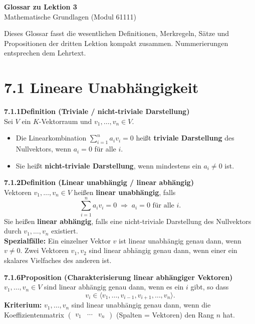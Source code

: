 \documentclass[a4paper,12pt]{article}
\newcommand{\gentry}[3]{%
  \noindent\textbf{#1\quad #2}\nopagebreak\\[0.2em]
  #3\par\smallskip
}
\begin{document}
\begin{center}
  {\LARGE\bfseries Glossar zu Lektion 3}\\[0.5em]
  {\large Mathematische Grundlagen (Modul 61111)}
\end{center}

\vspace{1em}

Dieses Glossar fasst die wesentlichen Definitionen, Merkregeln, Sätze und
Propositionen der dritten Lektion kompakt zusammen. Nummerierungen
entsprechen dem Lehrtext.

\section*{7.1 \quad Lineare Unabhängigkeit}

\gentry{7.1.1}{Definition (Triviale / nicht-triviale Darstellung)}{%
  Sei $V$ ein $K$-Vektorraum und $v_1,\ldots,v_n \in V$.
  \begin{itemize}[topsep=2pt,itemsep=1pt]
    \item Die Linearkombination $\sum_{i=1}^n a_i v_i = 0$ heißt
          \textbf{triviale Darstellung} des Nullvektors, wenn $a_i = 0$ für alle $i$.
    \item Sie heißt \textbf{nicht-triviale Darstellung}, wenn mindestens ein
          $a_i \neq 0$ ist.
  \end{itemize}
}

\gentry{7.1.2}{Definition (Linear unabhängig / linear abhängig)}{%
  Vektoren $v_1,\ldots,v_n \in V$ heißen \textbf{linear unabhängig}, falls
  \[
    \sum_{i=1}^n a_i v_i = 0 \;\Longrightarrow\; a_i = 0 \text{ für alle } i.
  \]
  Sie heißen \textbf{linear abhängig}, falls eine nicht-triviale Darstellung
  des Nullvektors durch $v_1,\ldots,v_n$ existiert.
  \smallskip\\
  \textbf{Spezialfälle:} Ein einzelner Vektor $v$ ist linear unabhängig genau
  dann, wenn $v \neq 0$. Zwei Vektoren $v_1, v_2$ sind linear abhängig genau
  dann, wenn einer ein skalares Vielfaches des anderen ist.
}

\gentry{7.1.6}{Proposition (Charakterisierung linear abhängiger Vektoren)}{%
  $v_1,\ldots,v_n \in V$ sind linear abhängig genau dann, wenn es ein $i$
  gibt, so dass
  \[
    v_i \in \langle v_1,\ldots,v_{i-1},v_{i+1},\ldots,v_n \rangle.
  \]
  \textbf{Kriterium:} $v_1,\ldots,v_n$ sind linear unabhängig genau dann,
  wenn die Koeffizientenmatrix $\begin{pmatrix}v_1 & \cdots & v_n\end{pmatrix}$
  (Spalten = Vektoren) den Rang $n$ hat.
}
\end{document}
